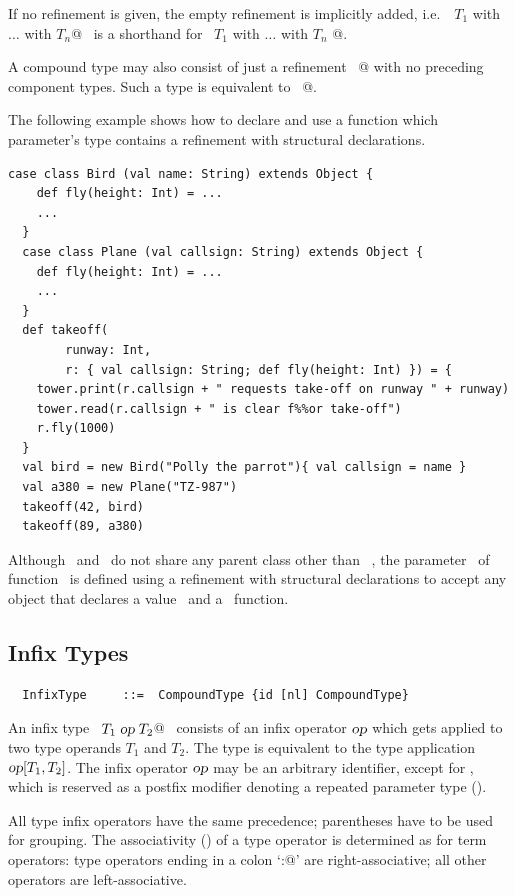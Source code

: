 If no refinement is given, the empty refinement is implicitly added,
i.e.\  ~\lstinline@$T_1$ with $\ldots$ with $T_n$@~ is a shorthand for
~\lstinline@$T_1$ with $\ldots$ with $T_n$ {}@.

A compound type may also consist of just a refinement
~@ with no preceding component types. Such a type is
equivalent to ~@.

\example The following example shows how to declare and use a function which parameter's type contains a refinement with structural declarations.
\begin{lstlisting}[escapechar=\%]
  case class Bird (val name: String) extends Object {
  	def fly(height: Int) = ...
	...
  }
  case class Plane (val callsign: String) extends Object {
  	def fly(height: Int) = ...
	...
  }
  def takeoff(
  	    runway: Int,
        r: { val callsign: String; def fly(height: Int) }) = {
    tower.print(r.callsign + " requests take-off on runway " + runway)
    tower.read(r.callsign + " is clear f%%or take-off")
    r.fly(1000)
  }
  val bird = new Bird("Polly the parrot"){ val callsign = name }
  val a380 = new Plane("TZ-987")
  takeoff(42, bird)
  takeoff(89, a380)
\end{lstlisting}
Although ~\lstinline@Bird@ and ~\lstinline@Plane@ do not share any parent class other than ~\lstinline@Object@, the parameter ~\lstinline@r@ of function ~\lstinline@takeoff@ is defined using a refinement with structural declarations to accept any object that declares a value ~\lstinline@callsign@ and a ~\lstinline@fly@ function.

 
\subsection{Infix Types}\label{sec:infix-types}

\syntax\begin{lstlisting}
  InfixType     ::=  CompoundType {id [nl] CompoundType}
\end{lstlisting}
An infix type ~\lstinline@$T_1\;\mbox{\sl op}\;T_2$@~ consists of an infix
operator $\mbox{\sl op}$ which gets applied to two type operands $T_1$ and
$T_2$.  The type is equivalent to the type application $\mbox{\sl op}[T_1,
T_2]$.  The infix operator $\mbox{\sl op}$ may be an arbitrary identifier,
except for \code{*}, which is reserved as a postfix modifier 
denoting a repeated parameter type (). 

All type infix operators have the same precedence; parentheses have to
be used for grouping. The associativity ()
of a type operator is determined as for term operators: type operators
ending in a colon `\lstinline@:@' are right-associative; all other
operators are left-associative.


